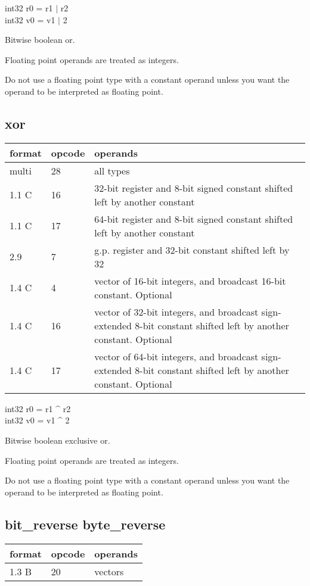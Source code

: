 \documentclass[forwardcom.tex]{subfiles}
\begin{document}
int32 r0 = r1 $|$ r2 \\
int32 v0 = v1 $|$ 2
\vv

Bitwise boolean or.
\vv

Floating point operands are treated as integers.

Do not use a floating point type with a constant operand unless you want the operand to be interpreted as floating point.
\vv

\subsection{xor}
\label{table:xorInstruction}
\begin{tabular}{|p{12mm}|p{12mm}|p{110mm}|}
\hline
\bfseries format & \bfseries opcode & \bfseries operands \\ \hline
multi & 28 & all types \\ \hline
1.1 C & 16 & 32-bit register and 8-bit signed constant shifted left by another constant \\ \hline
1.1 C & 17 & 64-bit register and 8-bit signed constant shifted left by another constant \\ \hline
2.9   &  7 & g.p. register and 32-bit constant shifted left by 32 \\ \hline
1.4 C &  4 & vector of 16-bit integers, and broadcast 16-bit constant. Optional \\ \hline
1.4 C & 16 & vector of 32-bit integers, and broadcast sign-extended 8-bit constant shifted left by another constant. Optional \\ \hline
1.4 C & 17 & vector of 64-bit integers, and broadcast sign-extended 8-bit constant shifted left by another constant. Optional \\ \hline
\end{tabular}
\vv

int32 r0 = r1 \^{} r2 \\
int32 v0 = v1 \^{} 2
\vv

Bitwise boolean exclusive or.
\vv

Floating point operands are treated as integers.

Do not use a floating point type with a constant operand unless you want the operand to be interpreted as floating point.
\vv

\subsection{bit\_reverse byte\_reverse}
\label{table:bitReverseInstruction}
\begin{tabular}{|p{12mm}|p{15mm}|p{100mm}|}
\hline
\bfseries format & \bfseries opcode & \bfseries operands \\ \hline
1.3 B & 20 & vectors \\ \hline
\end{tabular}
\vv
\end{document}
